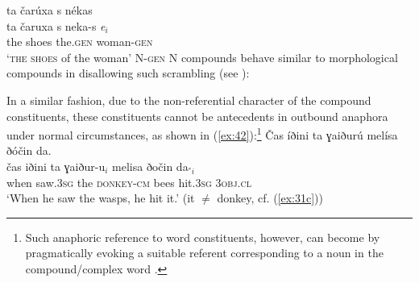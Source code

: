 \documentclass[output=paper]{LSP/langsci}
\begin{document}
\ea\label{ex:40}
	\glll ta čarúxa s nékas\\
			\lb{}ta čaruxa s neka-s \textit{e}$_i$\\
			the shoes the.\textsc{gen} woman-\textsc{gen}\\
	\glt `\textsc{the shoes} of the woman'
\z
N-\textsc{gen} N compounds behave similar to  morphological compounds in disallowing such scrambling (see \citealt{BagriacikRalli2015}):
\begin{multicols}{2}
\ea\label{ex:41}
	\z
\z
\end{multicols}
In a similar fashion, due to the non-referential character of the compound constituents, these constituents cannot be antecedents in outbound anaphora \citep{Postal1969,Sproat1988} under normal circumstances, as shown in (\ref{ex:42}):\footnote{Such anaphoric reference to word constituents, however, can become  by pragmatically evoking a suitable referent corresponding to a noun in the compound/complex word \citep{Wardetal1991}.}
\ea\label{ex:42}
	\glll \v{C}as íðini ta {} ɣaiðurú melísa ðóčin da.\\
			čas  iðini ta  ɣaiður-u$_i$ melisa\rb{} ðočin da$_{^*i}$\\
			when saw.\textsc{3sg} the {} \textsc{donkey-cm} bees hit.\textsc{3sg} 3\textsc{obj.cl}\\
	\glt `When he saw the wasps, he hit it.' \hfill (it $\neq$ donkey, cf. (\ref{ex:31c}))
\z
\end{document}
